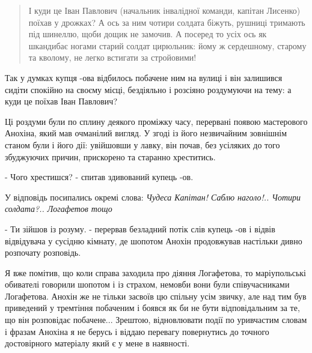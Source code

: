 \documentclass[a4paper,20pt]{report}
\begin{document}
\begin{quote}
\em\bfseries

І куди це Іван Павлович (начальник інвалідної команди, капітан Лисенко) поїхав у дрожках?
А ось за ним чотири солдата біжуть, рушниці тримають під шинеллю, щоби дощик не замочив. А посеред то усіх
ось як шкандибає ногами старий солдат цирюльник: йому ж сердешному, старому та кволому, не легко встигати за стройовими!
\end{quote}

Так у думках купця -ова відбилось побачене ним на вулиці і він залишився сидіти
спокійно на своєму місці, бездіяльно і розсіяно роздумуючи на тему: а куди це
поїхав Іван Павлович?

Ці роздуми були по сплину деякого проміжку часу, перервані появою мастерового
Анохіна, який мав очманілий вигляд. У згоді із його незвичайним зовнішнім
станом були і його дії: увійшовши у лавку, він почав, без усіляких до того
збуджуючих причин, прискорено та старанно хреститись.

- Чого хрестишся? - спитав здивований купець -ов.

У відповідь посипались окремі слова: \emph{Чудеса Капітан! Саблю наголо!..
Чотири солдата?.. Логафетов тощо}

- Ти зійшов із розуму. - перервав безладний потік слів купець -ов і відвів
відвідувача у сусідню кімнату, де шопотом Анохін продовжував настільки дивно
розпочату розповідь.

Я вже помітив, що коли справа заходила про діяння Логафетова, то маріупольські
обивателі говорили шопотом і із страхом, немовби вони були співучасниками
Логафетова. Анохін же не тільки засвоїв цю спільну усім звичку, але над тим був
приведений у тремтіння побаченим і боявся як би не бути відповідальним за те,
що він розповідає побачене... Зрештою, відновлювати події по уривчастим словам
і фразам Анохіна я не берусь і віддаю перевагу повернутись до точного
достовірного матеріалу який є у мене в наявності.

\end{document}
